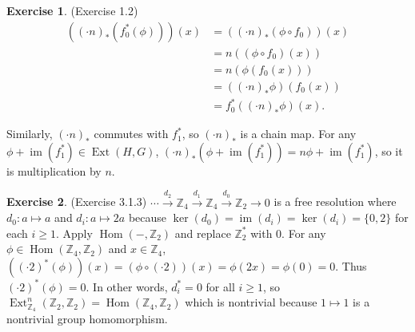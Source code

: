 \documentclass[12pt, psamsfonts]{amsart}
\theoremstyle{definition}
\newtheorem*{exer}{Exercise}
\theoremstyle{remark}
\DeclareMathOperator{\Ext}{Ext}
\DeclareMathOperator{\Hom}{Hom}
\DeclareMathOperator{\im}{im}
\numberwithin{equation}{section}
\begin{document}
\begin{exer}{(Exercise 1.2)}
  \begin{align*}
    ((\cdot n)_{\ast}(f_0^{\ast}(\phi)))(x)
      &= ((\cdot n)_{\ast}(\phi \circ f_0))(x) \\
      &= n((\phi \circ f_0)(x)) \\
      &= n(\phi(f_0(x))) \\
      &= ((\cdot n)_{\ast}\phi)(f_0(x)) \\
      &= f_0^{\ast}((\cdot n)_{\ast}\phi)(x).
  \end{align*}

  Similarly, $(\cdot n)_{\ast}$ commutes with $f_1^{\ast}$, so $(\cdot n)_{\ast}$ is a chain map.
  For any $\phi + \im(f_1^{\ast}) \in \Ext(H, G)$, $(\cdot n)_{\ast}(\phi + \im(f_1^{\ast})) = n\phi + \im(f_1^{\ast})$, so it is multiplication by $n$.
\end{exer}

\begin{exer}{(Exercise 3.1.3)}
  $\cdots \xrightarrow{d_2} \mathbb{Z}_4 \xrightarrow{d_1} \mathbb{Z}_4 \xrightarrow{d_0} \mathbb{Z}_2 \rightarrow 0$ is a free resolution where $d_0: a \mapsto a$ and $d_i: a \mapsto 2a$ because $\ker(d_0) = \im(d_i) = \ker(d_i) = \{ 0 , 2 \}$ for each $i \geq 1$.
  Apply $\Hom(-, \mathbb{Z}_2)$ and replace $\mathbb{Z}_2^{\ast}$ with 0.
  For any $\phi \in \Hom(\mathbb{Z}_4, \mathbb{Z}_2)$ and $x \in \mathbb{Z}_4$, $((\cdot 2)^{\ast}(\phi))(x) = (\phi \circ (\cdot 2))(x) = \phi(2x) = \phi(0) = 0$.
  Thus $(\cdot 2)^{\ast}(\phi) = 0$.
  In other words, $d_i^{\ast} = 0$ for all $i \geq 1$, so $\Ext^n_{\mathbb{Z}_4}(\mathbb{Z}_2, \mathbb{Z}_2) = \Hom(\mathbb{Z}_4, \mathbb{Z}_2)$ which is nontrivial because $1 \mapsto 1$ is a nontrivial group homomorphism.
\end{exer}
\end{document}
